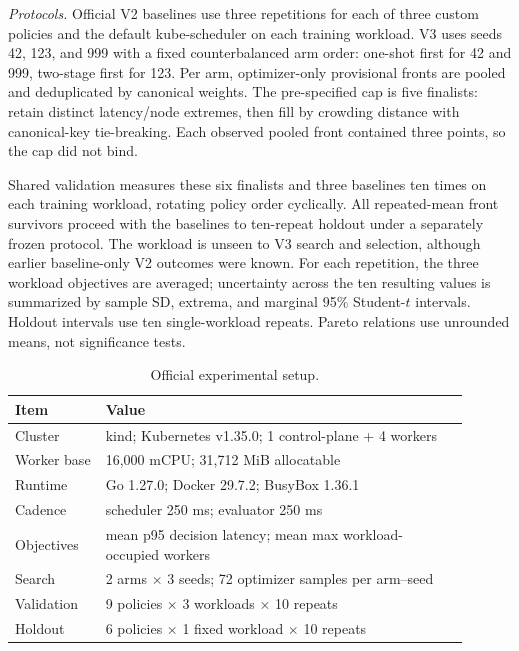 \documentclass[conference]{IEEEtran}
\begin{document}
\textit{Protocols.} Official V2 baselines use three repetitions for each of three custom policies and the default kube-scheduler on each training workload. V3 uses seeds 42, 123, and 999 with a fixed counterbalanced arm order: one-shot first for 42 and 999, two-stage first for 123. Per arm, optimizer-only provisional fronts are pooled and deduplicated by canonical weights. The pre-specified cap is five finalists: retain distinct latency/node extremes, then fill by crowding distance with canonical-key tie-breaking. Each observed pooled front contained three points, so the cap did not bind.

Shared validation measures these six finalists and three baselines ten times on each training workload, rotating policy order cyclically. All repeated-mean front survivors proceed with the baselines to ten-repeat holdout under a separately frozen protocol. The workload is unseen to V3 search and selection, although earlier baseline-only V2 outcomes were known. For each repetition, the three workload objectives are averaged; uncertainty across the ten resulting values is summarized by sample SD, extrema, and marginal 95\% Student-$t$ intervals. Holdout intervals use ten single-workload repeats. Pareto relations use unrounded means, not significance tests.

\begin{table}[t]
\caption{Official experimental setup.}
\label{tab:setup}
\centering
\begin{tabular}{p{0.18\linewidth} p{0.72\linewidth}}
\toprule
Item & Value \\
\midrule
Cluster & kind; Kubernetes v1.35.0; 1 control-plane + 4 workers \\
Worker base & 16,000 mCPU; 31,712 MiB allocatable \\
Runtime & Go 1.27.0; Docker 29.7.2; BusyBox 1.36.1 \\
Cadence & scheduler 250 ms; evaluator 250 ms \\
Objectives & mean p95 decision latency; mean max workload-occupied workers \\
Search & 2 arms $\times$ 3 seeds; 72 optimizer samples per arm--seed \\
Validation & 9 policies $\times$ 3 workloads $\times$ 10 repeats \\
Holdout & 6 policies $\times$ 1 fixed workload $\times$ 10 repeats \\
\bottomrule
\end{tabular}
\end{table}
\end{document}
